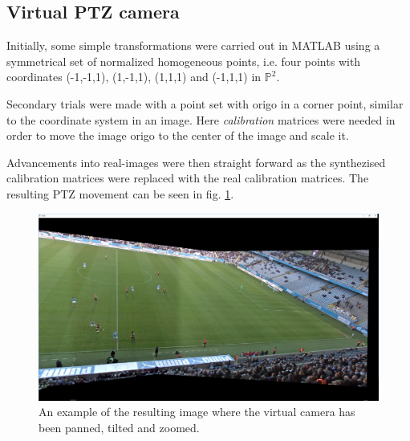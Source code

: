 \subsection{Virtual PTZ camera}
Initially, some simple transformations were carried out in MATLAB using a symmetrical set of normalized homogeneous points, i.e. four points with coordinates (-1,-1,1), (1,-1,1), (1,1,1) and (-1,1,1) in $\mathbb{P}^2$.

Secondary trials were made with a point set with origo in a corner point, similar to the coordinate system in an image.
Here {\it calibration} matrices were needed in order to move the image origo to the center of the image and scale it.

Advancements into real-images were then straight forward as the synthezised calibration matrices were replaced with the real calibration matrices.
The resulting PTZ movement can be seen in fig. \ref{fig:ptz_res}.

\begin{figure}[H]
	\centering
	\includegraphics[width=0.8\columnwidth]{../results/images/PTZ_res.PNG}
	\caption{An example of the resulting image where the virtual camera has been panned, tilted and zoomed.}
	\label{fig:ptz_res}
\end{figure}

